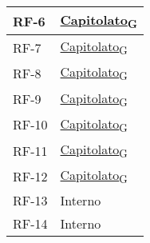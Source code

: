 \begin{longtable}{|>{\centering\arraybackslash}m{}|>{\centering\arraybackslash}m{}|}
	RF-6               & \href{https://7last.github.io/docs/rtb/documentazione-interna/glossario\#capitolato}{Capitolato\textsubscript{G}}                                                                                                                                    \\\hline
	RF-7               & \href{https://7last.github.io/docs/rtb/documentazione-interna/glossario\#capitolato}{Capitolato\textsubscript{G}}                                                                                                                                    \\\hline
	RF-8               & \href{https://7last.github.io/docs/rtb/documentazione-interna/glossario\#capitolato}{Capitolato\textsubscript{G}}                                                                                                                                    \\\hline
	RF-9               & \href{https://7last.github.io/docs/rtb/documentazione-interna/glossario\#capitolato}{Capitolato\textsubscript{G}}                                                                                                                                    \\\hline
	RF-10              & \href{https://7last.github.io/docs/rtb/documentazione-interna/glossario\#capitolato}{Capitolato\textsubscript{G}}                                                                                                                                    \\\hline
	RF-11              & \href{https://7last.github.io/docs/rtb/documentazione-interna/glossario\#capitolato}{Capitolato\textsubscript{G}}                                                                                                                                    \\\hline
	RF-12              & \href{https://7last.github.io/docs/rtb/documentazione-interna/glossario\#capitolato}{Capitolato\textsubscript{G}}                                                                                                                                    \\\hline
	RF-13              & Interno                                                                                                                                                                                                                                              \\\hline
	RF-14              & Interno                                                                                                                                                                                                                                              \\\hline

\end{longtable}
